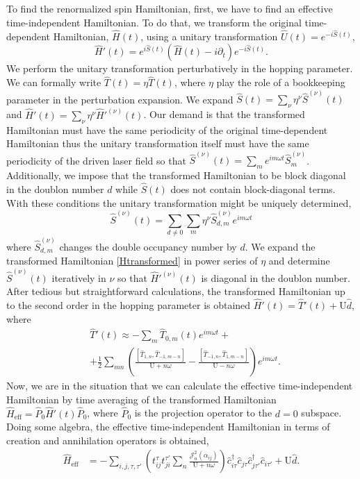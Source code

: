\documentclass[aps,prl,twocolumn,amsmath,amssymb,nobibnotes]{revtex4-1}%
\newcommand{\n}{\nonumber}
\begin{document}
To find the renormalized spin Hamiltonian, first, we have to find an effective time-independent Hamiltonian. To do that, we transform the original time-dependent Hamiltonian, $\hat{H}(t)$, using a unitary transformation $\hat{U}(t) = e^{-i\hat{S}(t)}$,
\begin{equation}
\hat{H}'(t) = e^{i\hat{S}(t)} \left(\hat{H}(t)  -  i\partial_t \right) e^{-i\hat{S}(t)}.
\label{Htransformed}
\end{equation}
We perform the unitary transformation perturbatively in the hopping parameter. We can formally write $\hat{T}(t) = \eta \hat{T}(t)$, where $\eta$ play the role of a bookkeeping parameter in the perturbation expansion. We expand $\hat{S}(t) = \sum_\nu \eta^\nu \hat{S}^{(\nu)}(t)$ and $\hat{H}'(t) = \sum_\nu \eta^\nu \hat{H}'^{(\nu)}(t)$. Our demand is that the transformed Hamiltonian must have the same periodicity of the original time-dependent Hamiltonian thus the unitary transformation itself must have the same periodicity of the driven laser field so that $\hat{S}^{(\nu)}(t) = \sum_m e^{im\omega t}\hat{S}^{(\nu)}_m$. Additionally, we impose that the transformed Hamiltonian to be block diagonal in the doublon number $d$ while $\hat{S}(t)$ does not contain block-diagonal terms. With these conditions the unitary transformation might be uniquely determined,
\begin{equation}
\hat{S}^{(\nu)}(t) = \sum_{d \neq 0} \sum_m \eta^\nu \hat{S}^{(\nu)}_{d,m} e^{im\omega t}
\end{equation}
where $\hat{S}^{(\nu)}_{d,m}$ changes the double occupancy number by $d$. We expand the transformed Hamiltonian \ref{Htransformed} in power series of $\eta$ and determine $\hat{S}^{(\nu)}(t)$ iteratively in $\nu$ so that $\hat{H}'^{(\nu)}(t)$ is diagonal in the doublon number. After tedious but straightforward calculations, the transformed Hamiltonian up to the second order in the hopping parameter is obtained $\hat{H}'(t)= \hat{T}'(t)+\text{U}\hat{d}$, where
\begin{align}
\label{transformedH}
&\hat{T}'(t) \approx  - \sum_m \hat{T}_{0,m}(t)e^{im\omega t} + \n \\
&+ \frac{1}{2}\sum_{mn} \left( \frac{\left[\hat{T}_{1,n}, \hat{T}_{-1,m-n} \right]}{\text{U}+n\omega} - \frac{\left[\hat{T}_{-1,n}, \hat{T}_{1,m-n} \right]}{\text{U}-n\omega} \right) e^{im\omega t}.
\end{align}
Now, we are in the situation that we can calculate the effective time-independent Hamiltonian by time averaging of the transformed Hamiltonian $\hat{H}_{\text{eff}}=\hat{P}_0\hat{H}'(t)\hat{P}_0$, where $\hat{P}_0$ is the projection operator to the $d=0$ subspace.
Doing some algebra, the effective time-independent Hamiltonian in terms of creation and annihilation operators is obtained,
\begin{align}
\hat{H}_{\text{eff}} &= - \sum_{i,j, \tau, \tau'} \left(t_{ij}^{\tau} t_{ji}^{\tau'} \sum_{n} \frac{\mathcal{J}_{n}^2(\alpha_{ij})}{\text{U}+n\omega} \right)  \hat{c}_{i \tau}^\dagger \hat{c}_{j \tau} \hat{c}_{j \tau'}^\dagger \hat{c}_{i \tau'}+\text{U}\hat{d}. \label{GeneralHeff}
\end{align}
\end{document}
